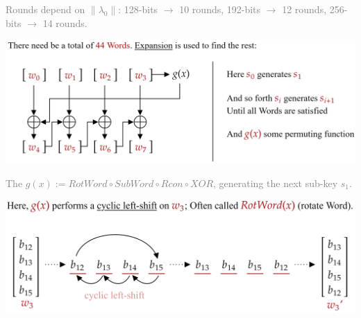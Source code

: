\vspace{1em}
\noindent
\textcolor{gray}{Rounds depend on $\|\lambda_0\|$: 128-bits $\rightarrow$ 10 rounds, 192-bits $\rightarrow$ 12 rounds, 256-bits $\rightarrow$ 14 rounds.}

\vspace{1em}
\hspace{-3em}
\includegraphics[width=1.1\textwidth]{Sections/sec/enc/aes/round_gen.png}

\noindent
\textcolor{gray}{The $g(x):=RotWord \circ SubWord \circ Rcon \circ XOR$, generating the next sub-key $s_1$.}

\vspace{1em}
\hspace{-3em}
\includegraphics[width=1.1\textwidth]{Sections/sec/enc/aes/g_func.png}


